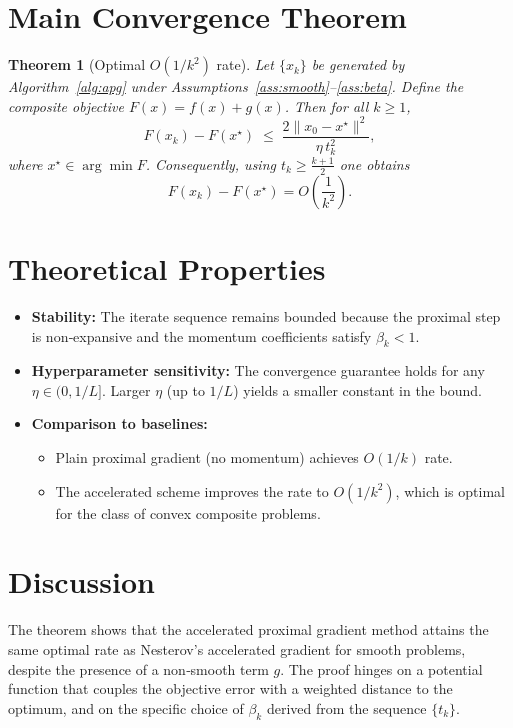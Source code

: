 \documentclass{article}
\newtheorem{theorem}{Theorem}
\begin{document}
\section*{Main Convergence Theorem}
\begin{theorem}[Optimal $O(1/k^2)$ rate]\label{thm:rate}
Let $\{x_k\}$ be generated by Algorithm~\ref{alg:apg} under Assumptions~\ref{ass:smooth}–\ref{ass:beta}. Define the composite objective $F(x)=f(x)+g(x)$. Then for all $k\ge 1$,
\[
F(x_k)-F(x^\star)\;\le\;\frac{2\|x_0-x^\star\|^{2}}{\eta\,t_k^{2}},
\]
where $x^\star\in\arg\min F$.
Consequently, using $t_k\ge \frac{k+1}{2}$ one obtains  
\[
F(x_k)-F(x^\star)=O\!\left(\frac{1}{k^{2}}\right).
\]
\end{theorem}

\section*{Theoretical Properties}
\begin{itemize}[leftmargin=*]
\item \textbf{Stability:} The iterate sequence remains bounded because the proximal step is non‑expansive and the momentum coefficients satisfy $\beta_k<1$.
\item \textbf{Hyperparameter sensitivity:} The convergence guarantee holds for any $\eta\in(0,1/L]$. Larger $\eta$ (up to $1/L$) yields a smaller constant in the bound.
\item \textbf{Comparison to baselines:}
    \begin{itemize}
    \item Plain proximal gradient (no momentum) achieves $O(1/k)$ rate.
    \item The accelerated scheme improves the rate to $O(1/k^{2})$, which is optimal for the class of convex composite problems.
    \end{itemize}
\end{itemize}

\section*{Discussion}
The theorem shows that the accelerated proximal gradient method attains the same optimal rate as Nesterov’s accelerated gradient for smooth problems, despite the presence of a non‑smooth term $g$. The proof hinges on a potential function that couples the objective error with a weighted distance to the optimum, and on the specific choice of $\beta_k$ derived from the sequence $\{t_k\}$.
\end{document}
